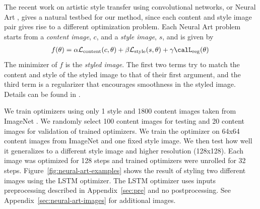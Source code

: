 The recent work on artistic style transfer using convolutional networks, or
Neural Art \citep{gatys:2015}, gives a natural testbed for our method, since
each content and style image pair gives rise to a different optimization
problem.  Each Neural Art problem starts from a \emph{content image}, $c$, and
a \emph{style image}, $s$, and is given by
\begin{align*}
f(\theta) = \alpha \mathcal{L}_\mathrm{content}(c, \theta)
+ \beta \mathcal{L}_\mathrm{style}(s, \theta) + \gamma \calL_{\mathrm{reg}}(\theta)
\,
\end{align*}
The minimizer of $f$ is the \emph{styled image}.
The first two terms try to match the content and style of the styled image to that of their first argument, and the third term is a regularizer that encourages smoothness in the styled image.
Details can be found in \citep{gatys:2015}.


We train optimizers using only 1 style and 1800 content images taken from
ImageNet \citep{deng:2009}.  We randomly select 100 content images for testing
and 20 content images for validation of trained optimizers.  We train the
optimizer on 64x64 content images from ImageNet and one fixed style image.  We
then test how well it generalizes to a different style image and higher
resolution (128x128).  Each image was optimized for 128 steps and trained
optimizers were unrolled for 32 steps.  Figure~\ref{fig:neural-art-examples}
shows the result of styling two different images using the LSTM optimizer.  The
LSTM optimizer uses inputs preprocessing described in Appendix~\ref{sec:pre}
and no postprocessing. See Appendix~\ref{sec:neural-art-images} for additional images.

